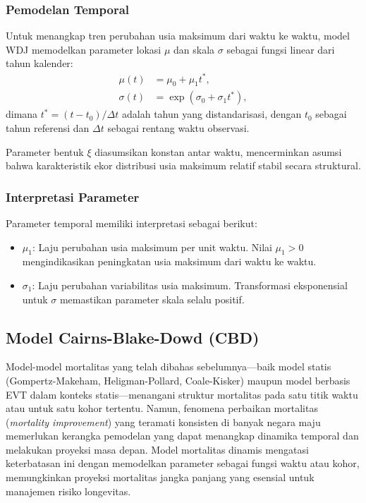 \subsubsection{Pemodelan Temporal}

Untuk menangkap tren perubahan usia maksimum dari waktu ke waktu, model WDJ memodelkan parameter lokasi $\mu$ dan skala $\sigma$ sebagai fungsi linear dari tahun kalender:
\begin{align}
\mu(t) &= \mu_0 + \mu_1 t^*, \label{eq:wdj_mu} \\
\sigma(t) &= \exp(\sigma_0 + \sigma_1 t^*), \label{eq:wdj_sigma}
\end{align}
dimana $t^* = (t - t_0)/\Delta t$ adalah tahun yang distandarisasi, dengan $t_0$ sebagai tahun referensi dan $\Delta t$ sebagai rentang waktu observasi.

Parameter bentuk $\xi$ diasumsikan konstan antar waktu, mencerminkan asumsi bahwa karakteristik ekor distribusi usia maksimum relatif stabil secara struktural.

\subsubsection{Interpretasi Parameter}

Parameter temporal memiliki interpretasi sebagai berikut:
\begin{itemize}
    \item \textbf{$\mu_1$}: Laju perubahan usia maksimum per unit waktu. Nilai $\mu_1 > 0$ mengindikasikan peningkatan usia maksimum dari waktu ke waktu.
    
    \item \textbf{$\sigma_1$}: Laju perubahan variabilitas usia maksimum. Transformasi eksponensial untuk $\sigma$ memastikan parameter skala selalu positif.
\end{itemize}

\subsection{Model Cairns-Blake-Dowd (CBD)}

Model-model mortalitas yang telah dibahas sebelumnya—baik model statis (Gompertz-Makeham, Heligman-Pollard, Coale-Kisker) maupun model berbasis EVT dalam konteks statis—menangani struktur mortalitas pada satu titik waktu atau untuk satu kohor tertentu. Namun, fenomena perbaikan mortalitas (\textit{mortality improvement}) yang teramati konsisten di banyak negara maju memerlukan kerangka pemodelan yang dapat menangkap dinamika temporal dan melakukan proyeksi masa depan. Model mortalitas dinamis mengatasi keterbatasan ini dengan memodelkan parameter sebagai fungsi waktu atau kohor, memungkinkan proyeksi mortalitas jangka panjang yang esensial untuk manajemen risiko longevitas.

